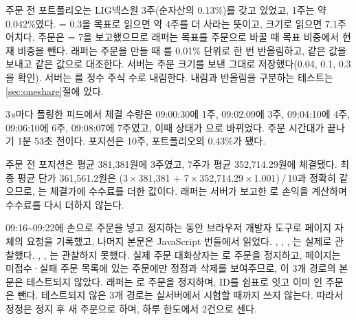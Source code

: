 

 주문 전 포트폴리오는 LIG넥스원 3주(순자산의 0.13\%)를 갖고 있었고, 1주는 약 0.042\%였다.  = 0.3을 목표로 읽으면 약 4주를 더 사라는 뜻이고, 크기로 읽으면 7.1주어치다. 주문은  = 7을 보고했으므로 래퍼는 목표를 주문으로 바꿀 때 목표 비중에서 현재 비중을 뺀다. 래퍼는 주문을 만들 때 를 0.01\% 단위로 한 번 반올림하고, 같은 값을 보내고 같은 값으로 대조한다. 서버는 주문 크기를 보낸 그대로 저장했다(0.04, 0.1, 0.3을 확인). 서버는 를 정수 주식 수로 내림한다. 내림과 반올림을 구분하는 테스트는 \ref{sec:oneshare}절에 있다.

 3\,s마다 폴링한 피드에서 체결 수량은 09:00:30에 1주, 09:02:09에 3주, 09:04:10에 4주, 09:06:10에 6주, 09:08:07에 7주였고, 이때 상태가 으로 바뀌었다. 주문 시간대가 끝나기 1분 53초 전이다. 포지션은 10주, 포트폴리오의 0.43\%가 됐다.



 주문 전 포지션은 평균 381,381원에 3주였고, 7주가 평균 352,714.29원에 체결됐다. 최종 평균 단가 361,561.2원은 (3\,×\,381,381 + 7\,×\,352,714.29\,×\,1.001)\,/\,10과 정확히 같으므로, 는 체결가에 수수료를 더한 값이다. 래퍼는 서버가 보고한 로 손익을 계산하며 수수료를 다시 더하지 않는다.

 09:16\textasciitilde 09:22에 손으로 주문을 넣고 정지하는 동안 브라우저 개발자 도구로 페이지 자체의 요청을 기록했고, 나머지 본문은 JavaScript 번들에서 읽었다. , , , 는 실제로 관찰했다. , , 는 관찰하지 못했다. 실제 주문 대화상자는 로 주문을 정지하고, 페이지는 미접수·실패 주문 목록에 있는 주문에만 정정과 삭제를 보여주므로, 이 3개 경로의 본문은 테스트되지 않았다. 래퍼는 로 주문을 정지하며, ID를 쉼표로 잇고 이미 인 주문은 뺀다. 테스트되지 않은 3개 경로는 실서버에서 시험할 때까지 쓰지 않는다. 따라서 정정은 정지 후 새 주문으로 하며, 하루 한도에서 2건으로 센다.



